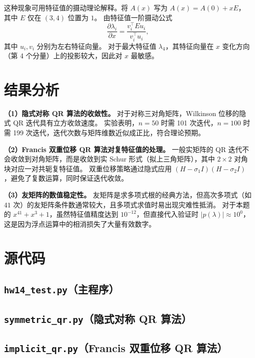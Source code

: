 \documentclass[10pt, a4paper]{article}
\begin{document}
这种现象可用特征值的摄动理论解释。将 $A(x)$ 写为 $A(x) = A(0) + x E$，其中 $E$ 仅在 $(3,4)$ 位置为 $1$。
由特征值一阶摄动公式
\[
\frac{\partial\lambda_i}{\partial x} = \frac{v_i^{\!\top} E u_i}{v_i^{\!\top} u_i},
\]
其中 $u_i, v_i$ 分别为左右特征向量。
对于最大特征值 $\lambda_4$，其特征向量在 $x$ 变化方向（第 4 个分量）上的投影较大，因此对 $x$ 最敏感。

\section{结果分析}

\textbf{（1）隐式对称 QR 算法的收敛性。}
对于对称三对角矩阵，Wilkinson 位移的隐式 QR 迭代具有立方收敛速度。
实验表明，$n=50$ 时需 101 次迭代，$n=100$ 时需 199 次迭代，迭代次数与矩阵维数近似成正比，符合理论预期。

\textbf{（2）Francis 双重位移 QR 算法对复特征值的处理。}
一般实矩阵的 QR 迭代不会收敛到对角矩阵，而是收敛到实 Schur 形式（拟上三角矩阵），其中 $2\times2$ 对角块对应一对共轭复特征值。
双重位移策略通过隐式应用 $(H - \sigma_1 I)(H - \sigma_2 I)$，避免了复数运算，同时保证迭代收敛。

\textbf{（3）友矩阵的数值稳定性。}
友矩阵是求多项式根的经典方法，但高次多项式（如 $41$ 次）的友矩阵条件数通常较大，且多项式求值时易出现灾难性抵消。
对于本题的 $x^{41} + x^3 + 1$，虽然特征值精度达到 $10^{-12}$，但直接代入验证时 $|p(\lambda)| \approx 10^0$，这是因为浮点运算中的相消损失了大量有效数字。

\appendix
\section{源代码}

\subsection{\texttt{hw14\_test.py}（主程序）}


\subsection{\texttt{symmetric\_qr.py}（隐式对称 QR 算法）}


\subsection{\texttt{implicit\_qr.py}（Francis 双重位移 QR 算法）}

\end{document}
